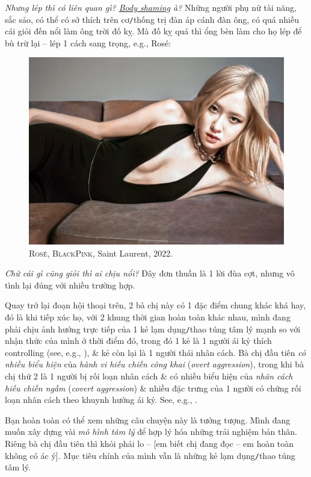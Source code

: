 \documentclass[12pt,oneside]{book}
\begin{document}
{\it Nhưng lép thì có liên quan gì? \href{https://en.wikipedia.org/wiki/Body_shaming}{Body shaming} à?} Những người phụ nữ tài năng, sắc sảo, có thể có sở thích trên cơ{\tt/}thống trị đàn áp cánh đàn ông, có quá nhiều cái giỏi đến nổi làm ông trời đố kỵ. Mà đố kỵ quá thì ổng bèn làm cho họ lép để bù trừ lại -- lép 1 cách sang trọng, e.g., Rosé:
\begin{figure}[H]
	\centering
	\includegraphics[scale=0.2]{Rose_boob}
	\caption{\textsc{Rosé, BlackPink}, Saint Laurent, 2022.}
\end{figure}
{\it Chứ cái gì cũng giỏi thì ai chịu nổi?} Đây đơn thuần là 1 lời đùa cợt, nhưng vô tình lại đúng với nhiều trường hợp.

Quay trở lại đoạn hội thoại trên, 2 bà chị này có 1 đặc điểm chung khác khá hay, đó là khi tiếp xúc họ, với 2 khung thời gian hoàn toàn khác nhau, mình đang phải chịu ảnh hưởng trực tiếp của 1 kẻ lạm dụng{\tt/}thao túng tâm lý mạnh so với nhận thức của mình ở thời điểm đó, trong đó 1 kẻ là 1 người ái kỷ thích controlling (see, e.g., \cite{Bancroft2002}), \& kẻ còn lại là 1 người thái nhân cách. Bà chị đầu tiên {\it có nhiều biểu hiện} của {\it hành vi hiếu chiến công khai} ({\it overt aggression}), trong khi bà chị thứ 2 là 1 người bị rối loạn nhân cách \& có nhiều biểu hiện của {\it nhân cách hiếu chiến ngầm} ({\it covert aggression}) \& nhiều đặc trưng của 1 người có chứng rối loạn nhân cách theo khuynh hướng ái kỷ. See, e.g., \cite{Simon2010}.

Bạn hoàn toàn có thể xem những câu chuyện này là tưởng tượng. Mình đang muốn xây dựng vài {\it mô hình tâm lý} để hợp lý hóa những trải nghiệm bản thân. Riêng bà chị đầu tiên thì khỏi phải lo -- [em biết chị đang đọc -- em hoàn toàn không có ác ý]. Mục tiêu chính của mình vẫn là những kẻ lạm dụng{\tt/}thao túng tâm lý.
\end{document}
